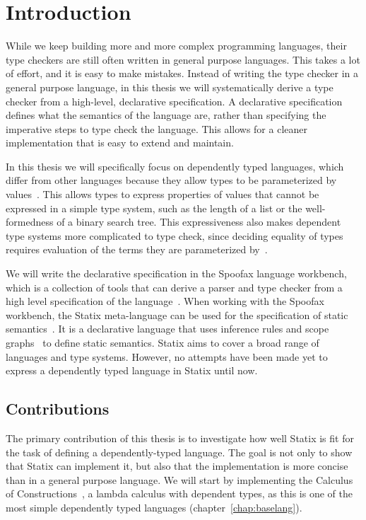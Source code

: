 \chapter{Introduction}

While we keep building more and more complex programming languages, their type checkers are still often written in general purpose languages. This takes a lot of effort, and it is easy to make mistakes. Instead of writing the type checker in a general purpose language, in this thesis we will systematically derive a type checker from a high-level, declarative specification. A declarative specification defines what the semantics of the language are, rather than specifying the imperative steps to type check the language. This allows for a cleaner implementation that is easy to extend and maintain. 

In this thesis we will specifically focus on dependently typed languages, which differ from other languages because they allow types to be parameterized by values~\cite{lambda_cube}. This allows types to express properties of values that cannot be expressed in a simple type system, such as the length of a list or the well-formedness of a binary search tree. This expressiveness also makes dependent type systems more complicated to type check, since deciding equality of types requires evaluation of the terms they are parameterized by~\cite{Coquand_Huet_1988}. 

We will write the declarative specification in the Spoofax language workbench, which is a collection of tools that can derive a parser and type checker from a high level specification of the language~\cite{spoofax}. When working with the Spoofax workbench, the Statix meta-language can be used for the specification of static semantics~\cite{scopes_as_types}. It is a declarative language that uses inference rules and scope graphs~\cite{scope_graphs} to define static semantics. Statix aims to cover a broad range of languages and type systems. However, no attempts have been made yet to express a dependently typed language in Statix until now.
 

\section*{Contributions}
The primary contribution of this thesis is to investigate how well Statix is fit for the task of defining a dependently-typed language. The goal is not only to show that Statix can implement it, but also that the implementation is more concise than in a general purpose language. We will start by implementing the Calculus of Constructions~\cite{Coquand_Huet_1988}, a lambda calculus with dependent types, as this is one of the most simple dependently typed languages (chapter~\ref{chap:baselang}). 

